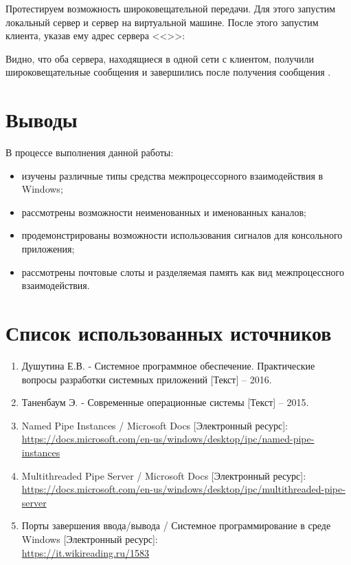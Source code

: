 Протестируем возможность широковещательной передачи. Для этого запустим локальный сервер и сервер на виртуальной машине. После этого запустим клиента, указав ему адрес сервера <<\code{*}>>:







Видно, что оба сервера, находящиеся в одной сети с клиентом, получили широковещательные сообщения и завершились после получения сообщения .

\section{Выводы}

В процессе выполнения данной работы:

\begin{itemize}
	\item изучены различные типы средства межпроцессорного взаимодействия в Windows;
	\item рассмотрены возможности неименованных и именованных каналов;
	\item продемонстрированы возможности использования сигналов для консольного приложения; 
	\item рассмотрены почтовые слоты и разделяемая память как вид межпроцессного взаимодействия.
\end{itemize}

\section*{Список использованных источников}

\begin{enumerate}
	\item Душутина Е.В. - Системное программное обеспечение. Практические вопросы разработки системных приложений [Текст] -- 2016.
	\item Таненбаум Э. - Современные операционные системы [Текст] -- 2015.
	\item Named Pipe Instances / Microsoft Docs [Электронный ресурс]:\\
		{\small\url{https://docs.microsoft.com/en-us/windows/desktop/ipc/named-pipe-instances}} 
	\item Multithreaded Pipe Server / Microsoft Docs [Электронный ресурс]:\\
		{\small\url{https://docs.microsoft.com/en-us/windows/desktop/ipc/multithreaded-pipe-server}} 
	\item Порты завершения ввода/вывода / Системное программирование в среде Windows [Электронный ресурс]:\\
		{\small\url{https://it.wikireading.ru/1583}} 
\end{enumerate}


